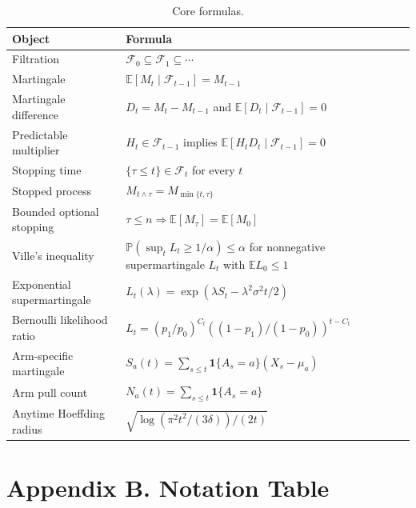 \documentclass[en,nofont,11pt]{elegantbook}
\newcommand{\E}{\mathbb{E}}
\newcommand{\Pbb}{\mathbb{P}}
\newcommand{\one}{\mathbf{1}}
\newcommand{\F}{\mathcal{F}}
\begin{document}
\begin{table}[H]
\centering
\caption*{Core formulas.}
\begin{tabular}{p{}p{}}
\toprule
Object & Formula \\
\midrule
Filtration & $\F_0\subseteq\F_1\subseteq\cdots$ \\
Martingale & $\E[M_t\mid\F_{t-1}]=M_{t-1}$ \\
Martingale difference & $D_t=M_t-M_{t-1}$ and $\E[D_t\mid\F_{t-1}]=0$ \\
Predictable multiplier & $H_t\in\F_{t-1}$ implies $\E[H_tD_t\mid\F_{t-1}]=0$ \\
Stopping time & $\{\tau\le t\}\in\F_t$ for every $t$ \\
Stopped process & $M_{t\wedge\tau}=M_{\min\{t,\tau\}}$ \\
Bounded optional stopping & $\tau\le n\Rightarrow\E[M_\tau]=\E[M_0]$ \\
Ville's inequality & $\Pbb(\sup_tL_t\ge1/\alpha)\le\alpha$ for nonnegative supermartingale $L_t$ with $\E L_0\le1$ \\
Exponential supermartingale & $L_t(\lambda)=\exp(\lambda S_t-\lambda^2\sigma^2t/2)$ \\
Bernoulli likelihood ratio & $L_t=(p_1/p_0)^{C_t}((1-p_1)/(1-p_0))^{t-C_t}$ \\
Arm-specific martingale & $S_a(t)=\sum_{s\le t}\one\{A_s=a\}(X_s-\mu_a)$ \\
Arm pull count & $N_a(t)=\sum_{s\le t}\one\{A_s=a\}$ \\
Anytime Hoeffding radius & $\sqrt{\log(\pi^2t^2/(3\delta))/(2t)}$ \\
\bottomrule
\end{tabular}
\end{table}

\chapter*{Appendix B. Notation Table}
\end{document}
